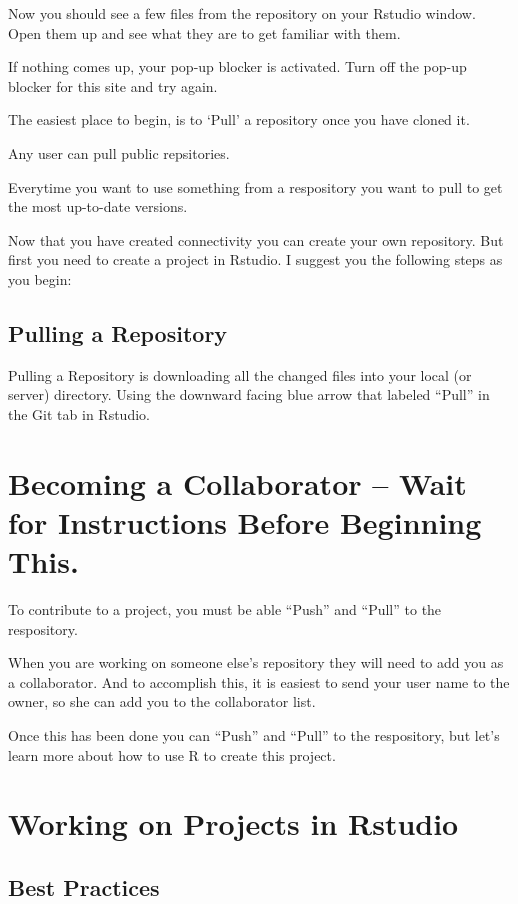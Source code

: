 \documentclass[12pt]{../SOP4_alpha}\usepackage[]{graphicx}\usepackage[]{color}
\begin{document}
\NP Now you should see a few files from the repository on your Rstudio window. Open them up and see what they are to get familiar with them.

\NP If nothing comes up, your pop-up blocker is activated. Turn off the pop-up blocker for this site and try again. 

\NP The easiest place to begin, is to `Pull' a repository once you have cloned it. 

\NP Any user can pull public repsitories. 

\NP Everytime you want to use something from a respository you want to pull to get the most up-to-date versions. 

\NP Now that you have created connectivity you can create your own repository. But first you need to create a project in Rstudio. I suggest you the following steps as you begin:


\subsection{Pulling a Repository}

\NP Pulling a Repository is downloading all the changed files into your local (or server) directory. Using the downward facing blue arrow that labeled ``Pull'' in the Git tab in Rstudio.

\section{Becoming a Collaborator -- Wait for Instructions Before Beginning This.}

\NP To contribute to a project, you must be able ``Push'' and ``Pull'' to the respository. 

\NP When you are working on someone else's repository they will need to add you as a collaborator. And to accomplish this, it is easiest to send your user name to the owner, so she can add you to the collaborator list.  

\NP Once this has been done you can ``Push'' and ``Pull'' to the respository, but let's learn more about how to use R to create this project. 


\section{Working on Projects in Rstudio}

\subsection{Best Practices}
\end{document}
